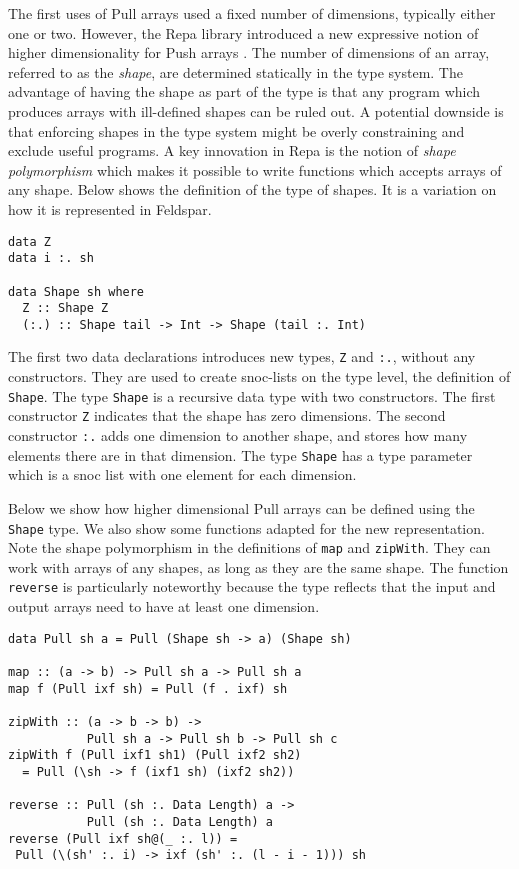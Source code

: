 \documentclass[preprint]{sigplanconf}
\begin{document}
The first uses of Pull arrays used a fixed number of dimensions,
typically either one or two. However, the Repa library introduced a
new expressive notion of higher dimensionality for Push arrays
\cite{keller2010regular}. The number of dimensions of an array, referred
to as the \emph{shape}, are determined statically in the type
system. The advantage of having the shape as part of the type is that
any program which produces arrays with ill-defined shapes can be ruled
out. A potential downside is that enforcing shapes in the type system might
be overly constraining and exclude useful programs. A key innovation in
Repa is the notion of \emph{shape polymorphism} which makes it
possible to write functions which accepts arrays of any shape. Below
shows the definition of the type of shapes. It is a variation on how
it is represented in Feldspar.

\begin{small}
\begin{Verbatim}
data Z
data i :. sh

data Shape sh where
  Z :: Shape Z
  (:.) :: Shape tail -> Int -> Shape (tail :. Int)
\end{Verbatim}
\end{small}

The first two data declarations introduces new types, \verb!Z! and
\verb!:.!, without any constructors. They are used to create
snoc-lists on the type level, the definition of \verb!Shape!.  The
type \verb!Shape! is a recursive data type with two constructors. The
first constructor \verb!Z! indicates that the shape has zero
dimensions.  The second constructor \verb!:.! adds one dimension to
another shape, and stores how many elements there are in that
dimension. The type \verb!Shape! has a type parameter which is a snoc
list with one element for each dimension.

Below we show how higher dimensional Pull arrays can be defined using
the \verb!Shape! type. We also show some functions adapted for the new
representation. Note the shape polymorphism in the definitions of
\verb!map! and \verb!zipWith!. They can work with arrays of any
shapes, as long as they are the same shape.  The function
\verb!reverse! is particularly noteworthy because the type reflects
that the input and output arrays need to have at least one dimension.

\begin{small}
\begin{Verbatim}
data Pull sh a = Pull (Shape sh -> a) (Shape sh)

map :: (a -> b) -> Pull sh a -> Pull sh a
map f (Pull ixf sh) = Pull (f . ixf) sh

zipWith :: (a -> b -> b) -> 
           Pull sh a -> Pull sh b -> Pull sh c
zipWith f (Pull ixf1 sh1) (Pull ixf2 sh2)
  = Pull (\sh -> f (ixf1 sh) (ixf2 sh2))

reverse :: Pull (sh :. Data Length) a ->
           Pull (sh :. Data Length) a
reverse (Pull ixf sh@(_ :. l)) =
 Pull (\(sh' :. i) -> ixf (sh' :. (l - i - 1))) sh
\end{Verbatim}
\end{small}
\end{document}
